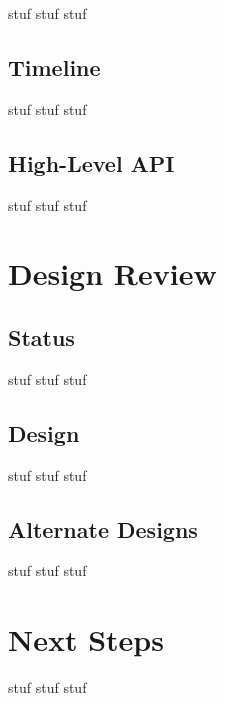 \documentclass[11pt]{article}
\begin{document}

stuf stuf stuf

\subsection{Timeline}

stuf stuf stuf

\subsection{High-Level API}

stuf stuf stuf

\section{Design Review}

\subsection{Status}

stuf stuf stuf

\subsection{Design}

stuf stuf stuf

\subsection{Alternate Designs}

stuf stuf stuf

\section{Next Steps}

stuf stuf stuf
\end{document}
